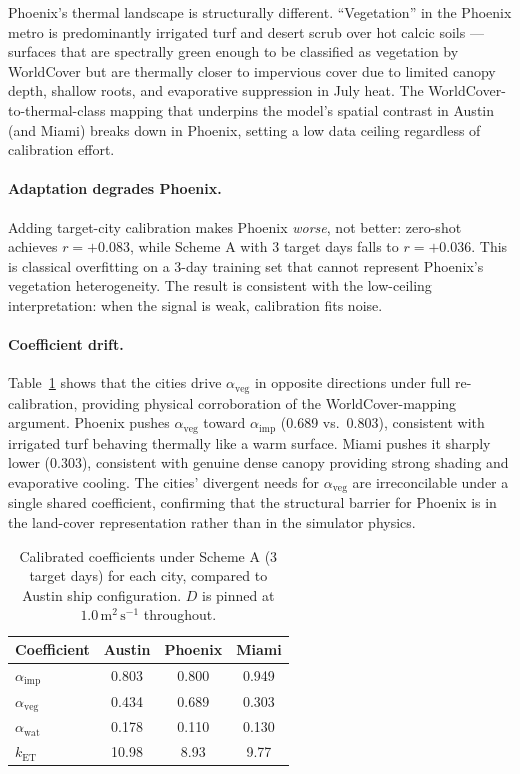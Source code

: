 \documentclass[12pt, letterpaper]{article}
\begin{document}
Phoenix's thermal landscape is structurally different. ``Vegetation'' in
the Phoenix metro is predominantly irrigated turf and desert scrub over
hot calcic soils — surfaces that are spectrally green enough to be
classified as vegetation by WorldCover but are thermally closer to
impervious cover due to limited canopy depth, shallow roots, and
evaporative suppression in July heat. The WorldCover-to-thermal-class
mapping that underpins the model's spatial contrast in Austin (and Miami)
breaks down in Phoenix, setting a low data ceiling regardless of
calibration effort.

\paragraph{Adaptation degrades Phoenix.}
Adding target-city calibration makes Phoenix \emph{worse}, not better:
zero-shot achieves $r = +0.083$, while Scheme A with 3 target days
falls to $r = +0.036$. This is classical overfitting on a 3-day
training set that cannot represent Phoenix's vegetation heterogeneity.
The result is consistent with the low-ceiling interpretation: when the
signal is weak, calibration fits noise.

\paragraph{Coefficient drift.}
Table~\ref{tab:coef_drift} shows that the cities drive
$\alpha_{\mathrm{veg}}$ in opposite directions under full re-calibration,
providing physical corroboration of the WorldCover-mapping argument.
Phoenix pushes $\alpha_{\mathrm{veg}}$ toward $\alpha_{\mathrm{imp}}$
(0.689 vs.\ 0.803), consistent with irrigated turf behaving thermally
like a warm surface. Miami pushes it sharply lower (0.303), consistent
with genuine dense canopy providing strong shading and evaporative
cooling. The cities' divergent needs for $\alpha_{\mathrm{veg}}$ are
irreconcilable under a single shared coefficient, confirming that the
structural barrier for Phoenix is in the land-cover representation rather
than in the simulator physics.

\begin{table}[ht]
  \centering
  \caption{Calibrated coefficients under Scheme A (3 target days) for
  each city, compared to Austin ship configuration. $D$ is pinned at
  $1.0\,\text{m}^2\,\text{s}^{-1}$ throughout.}
  \label{tab:coef_drift}
  \begin{tabular}{lccc}
    \toprule
    Coefficient & Austin & Phoenix & Miami \\
    \midrule
    $\alpha_{\mathrm{imp}}$ & 0.803 & 0.800 & 0.949 \\
    $\alpha_{\mathrm{veg}}$ & 0.434 & 0.689 & 0.303 \\
    $\alpha_{\mathrm{wat}}$ & 0.178 & 0.110 & 0.130 \\
    $k_{\mathrm{ET}}$       & 10.98 & 8.93  & 9.77  \\
    \bottomrule
  \end{tabular}
\end{table}
\end{document}
